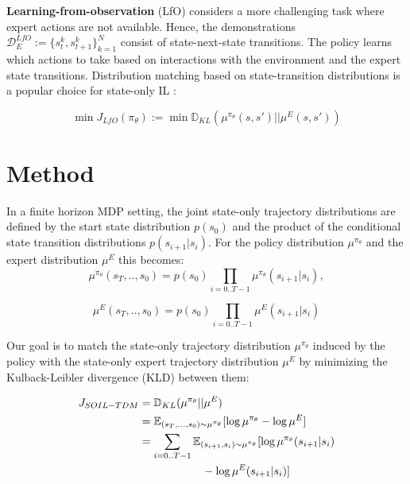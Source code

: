 \documentclass{article}
\begin{document}
\textbf{Learning-from-observation} (LfO) considers a more challenging task where expert actions are not available. Hence, the demonstrations $\mathcal{D}^{LfO}_E:=\{s^k_t, s^k_{t+1}\}^N_{k=1}$ consist of state-next-state transitions.
The policy learns which actions to take based on interactions with the environment and the expert state transitions. 
Distribution matching based on state-transition distributions is a popular choice for state-only IL \cite{torabi2018generative,zhu2020off}: 

\begin{equation}
\min J_{LfO}(\pi_{\theta}) := \min \mathbb{D}_{KL}(\mu^{\pi_{\theta}}(s,s')||\mu^{E}(s,s'))    
\end{equation}


\section{Method}\label{sec:method}
In a finite horizon MDP setting, the joint state-only trajectory distributions are defined by the start state distribution $p(s_0)$ and the product of the conditional state transition distributions $p(s_{i+1} | s_i)$. For the policy distribution $\mu^{\pi_{\theta}}$ and the expert distribution $\mu^{E}$ this becomes:
\[\mu^{\pi_{\theta}}(s_T,..,s_0) = p(s_0) \prod_{i = 0..T-1} \mu^{\pi_{\theta}}(s_{i+1}|s_i),\]

\[\mu^{E}(s_T,..,s_0) = p(s_0)  \prod_{i = 0..T-1} \mu^{E}(s_{i+1}|s_i)\]

Our goal is to match the state-only trajectory distribution $\mu^{\pi_{\theta}}$ induced by the policy with the state-only expert trajectory distribution $\mu^{E}$ by minimizing the Kulback-Leibler divergence (KLD) between them:  

\begin{equation}\label{eq:kldsoiltdm_base}
\begin{aligned}
J_{SOIL-TDM} & = \mathbb{D}_{KL}(\mu^{\pi_{\theta}}||\mu^{E}) \\
& = \mathbb{E}_{(s_T,...,s_0) \sim \mu^{\pi_{\theta}}}[\log \mu^{\pi_{\theta}} - \log \mu^{E}]\\
& = \sum_{i = 0..T-1} \mathbb{E}_{(s_{i+1},s_i) \sim \mu^{\pi_{\theta}}}[\log  \mu^{\pi_{\theta}}(s_{i+1}|s_i) \\ & \hspace{2.0cm} - \log  \mu^{E}(s_{i+1}|s_i)]
\end{aligned}
\end{equation}
\end{document}
